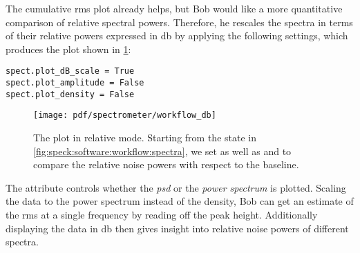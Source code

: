 The cumulative \gls{rms} plot already helps, but Bob would like a more quantitative comparison of relative spectral powers.
Therefore, he rescales the spectra in terms of their relative powers expressed in \unit{\decibel}
by applying the following settings, which produces the plot shown in \cref{fig:speck:software:workflow:db}:
\begin{verbatim}
spect.plot_dB_scale = True
spect.plot_amplitude = False
spect.plot_density = False
\end{verbatim}
\begin{figure}
    \centering
    \texttt{[image: pdf/spectrometer/workflow\_db]}
    \caption[The \pyspeck plot in relative mode.]{
        The \pyspeck plot in relative mode.
        Starting from the state in \cref{fig:speck:software:workflow:spectra}, we set  as well as  and  to compare the relative noise powers with respect to the baseline.
    }
    \label{fig:speck:software:workflow:db}
\end{figure}
The attribute  controls whether the \emph{\acrlong{psd}} or the \emph{power spectrum} is plotted.
Scaling the data to the power spectrum instead of the density, Bob can get an estimate of the \gls{rms} at a single frequency by reading off the peak height.
Additionally displaying the data in \unit{\decibel} then gives insight into relative noise powers of different spectra.

